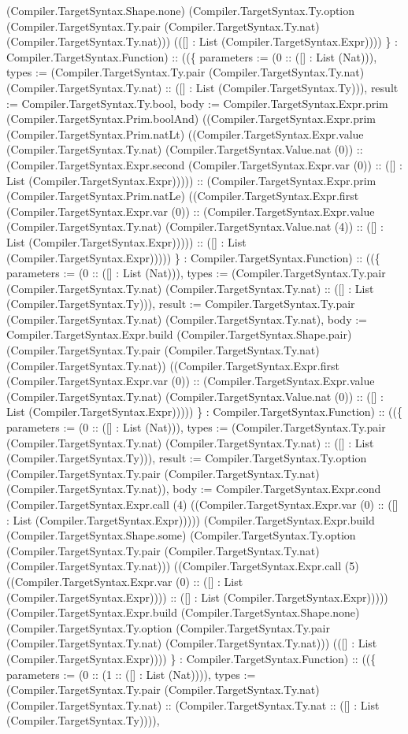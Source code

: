 \documentclass[11pt]{article}
\begin{document}
(Compiler.TargetSyntax.Shape.none) (Compiler.TargetSyntax.Ty.option (Compiler.TargetSyntax.Ty.pair (Compiler.TargetSyntax.Ty.nat) (Compiler.TargetSyntax.Ty.nat))) (([] : List (Compiler.TargetSyntax.Expr)))) \} : Compiler.TargetSyntax.Function) :: ((\{ parameters := (0 :: ([] : List (Nat))), types := (Compiler.TargetSyntax.Ty.pair (Compiler.TargetSyntax.Ty.nat) (Compiler.TargetSyntax.Ty.nat) :: ([] : List (Compiler.TargetSyntax.Ty))), result := Compiler.TargetSyntax.Ty.bool, body := Compiler.TargetSyntax.Expr.prim (Compiler.TargetSyntax.Prim.boolAnd) ((Compiler.TargetSyntax.Expr.prim (Compiler.TargetSyntax.Prim.natLt) ((Compiler.TargetSyntax.Expr.value (Compiler.TargetSyntax.Ty.nat) (Compiler.TargetSyntax.Value.nat (0)) :: (Compiler.TargetSyntax.Expr.second (Compiler.TargetSyntax.Expr.var (0)) :: ([] : List (Compiler.TargetSyntax.Expr))))) :: (Compiler.TargetSyntax.Expr.prim (Compiler.TargetSyntax.Prim.natLe) ((Compiler.TargetSyntax.Expr.first (Compiler.TargetSyntax.Expr.var (0)) :: (Compiler.TargetSyntax.Expr.value (Compiler.TargetSyntax.Ty.nat) (Compiler.TargetSyntax.Value.nat (4)) :: ([] : List (Compiler.TargetSyntax.Expr))))) :: ([] : List (Compiler.TargetSyntax.Expr))))) \} : Compiler.TargetSyntax.Function) :: ((\{ parameters := (0 :: ([] : List (Nat))), types := (Compiler.TargetSyntax.Ty.pair (Compiler.TargetSyntax.Ty.nat) (Compiler.TargetSyntax.Ty.nat) :: ([] : List (Compiler.TargetSyntax.Ty))), result := Compiler.TargetSyntax.Ty.pair (Compiler.TargetSyntax.Ty.nat) (Compiler.TargetSyntax.Ty.nat), body := Compiler.TargetSyntax.Expr.build (Compiler.TargetSyntax.Shape.pair) (Compiler.TargetSyntax.Ty.pair (Compiler.TargetSyntax.Ty.nat) (Compiler.TargetSyntax.Ty.nat)) ((Compiler.TargetSyntax.Expr.first (Compiler.TargetSyntax.Expr.var (0)) :: (Compiler.TargetSyntax.Expr.value (Compiler.TargetSyntax.Ty.nat) (Compiler.TargetSyntax.Value.nat (0)) :: ([] : List (Compiler.TargetSyntax.Expr))))) \} : Compiler.TargetSyntax.Function) :: ((\{ parameters := (0 :: ([] : List (Nat))), types := (Compiler.TargetSyntax.Ty.pair (Compiler.TargetSyntax.Ty.nat) (Compiler.TargetSyntax.Ty.nat) :: ([] : List (Compiler.TargetSyntax.Ty))), result := Compiler.TargetSyntax.Ty.option (Compiler.TargetSyntax.Ty.pair (Compiler.TargetSyntax.Ty.nat) (Compiler.TargetSyntax.Ty.nat)), body := Compiler.TargetSyntax.Expr.cond (Compiler.TargetSyntax.Expr.call (4) ((Compiler.TargetSyntax.Expr.var (0) :: ([] : List (Compiler.TargetSyntax.Expr))))) (Compiler.TargetSyntax.Expr.build (Compiler.TargetSyntax.Shape.some) (Compiler.TargetSyntax.Ty.option (Compiler.TargetSyntax.Ty.pair (Compiler.TargetSyntax.Ty.nat) (Compiler.TargetSyntax.Ty.nat))) ((Compiler.TargetSyntax.Expr.call (5) ((Compiler.TargetSyntax.Expr.var (0) :: ([] : List (Compiler.TargetSyntax.Expr)))) :: ([] : List (Compiler.TargetSyntax.Expr))))) (Compiler.TargetSyntax.Expr.build (Compiler.TargetSyntax.Shape.none) (Compiler.TargetSyntax.Ty.option (Compiler.TargetSyntax.Ty.pair (Compiler.TargetSyntax.Ty.nat) (Compiler.TargetSyntax.Ty.nat))) (([] : List (Compiler.TargetSyntax.Expr)))) \} : Compiler.TargetSyntax.Function) :: ((\{ parameters := (0 :: (1 :: ([] : List (Nat)))), types := (Compiler.TargetSyntax.Ty.pair (Compiler.TargetSyntax.Ty.nat) (Compiler.TargetSyntax.Ty.nat) :: (Compiler.TargetSyntax.Ty.nat :: ([] : List (Compiler.TargetSyntax.Ty)))), 
\end{document}
